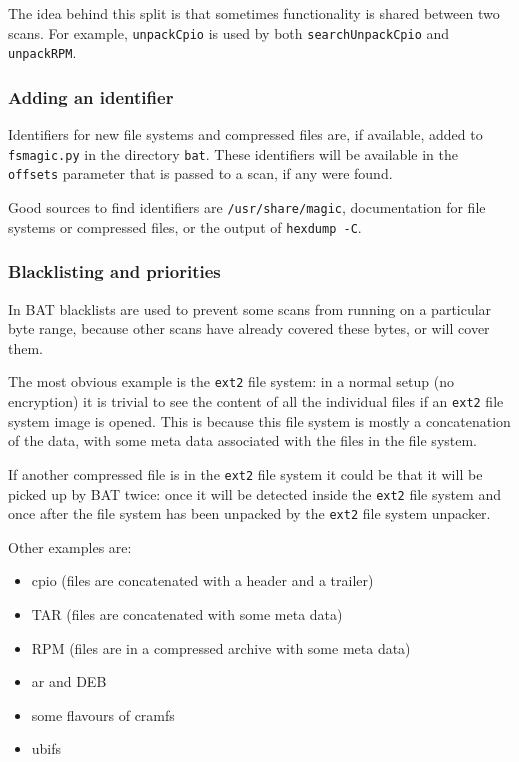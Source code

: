 \documentclass[10pt]{article}
\begin{document}
The idea behind this split is that sometimes functionality is shared between
two scans. For example, \texttt{unpackCpio} is used by both
\texttt{searchUnpackCpio} and \texttt{unpackRPM}.

\subsubsection{Adding an identifier}

Identifiers for new file systems and compressed files are, if available, added
to \texttt{fsmagic.py} in the directory \texttt{bat}. These identifiers will be
available in the \texttt{offsets} parameter that is passed to a scan, if any
were found.

Good sources to find identifiers are \texttt{/usr/share/magic}, documentation
for file systems or compressed files, or the output of \texttt{hexdump -C}.

\subsubsection{Blacklisting and priorities}

In BAT blacklists are used to prevent some scans from running on a particular
byte range, because other scans have already covered these bytes, or will cover
them.

The most obvious example is the \texttt{ext2} file system: in a normal setup
(no encryption) it is trivial to see the content of all the individual files
if an \texttt{ext2} file system image is opened. This is because this file
system is mostly a concatenation of the data, with some meta data associated
with the files in the file system.

If another compressed file is in the \texttt{ext2} file system it could be that
it will be picked up by BAT twice: once it will be detected inside the
\texttt{ext2} file system and once after the file system has been unpacked by
the \texttt{ext2} file system unpacker.

Other examples are:

\begin{itemize}
\item cpio (files are concatenated with a header and a trailer)
\item TAR (files are concatenated with some meta data)
\item RPM (files are in a compressed archive with some meta data)
\item ar and DEB
\item some flavours of cramfs
\item ubifs
\end{itemize}
\end{document}
